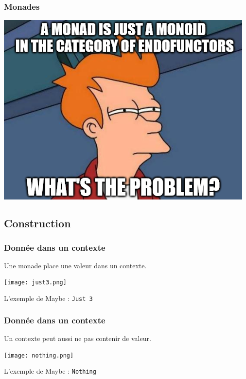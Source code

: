 \documentclass{beamer}
\begin{document}
\begin{frame}

\frametitle{Monades}
\begin{center}
\includegraphics[scale=0.5]{monad_meme.png}
\end{center}
\end{frame}

\subsection{Construction}
\begin{frame}
\frametitle{Donnée dans un contexte}

\begin{block}{}
Une monade place une valeur dans un contexte.
\end{block}

\begin{center}
\texttt{[image: just3.png]}
\end{center}

\begin{exampleblock}{}
L'exemple de Maybe : \verb!Just 3!
\end{exampleblock}
\end{frame}

\begin{frame}
\frametitle{Donnée dans un contexte}

\begin{block}{}
Un contexte peut aussi ne pas contenir de valeur.
\end{block}

\begin{center}
\texttt{[image: nothing.png]}
\end{center}
\begin{exampleblock}{}
L'exemple de Maybe : \verb!Nothing!
\end{exampleblock}
\end{frame}
\end{document}
